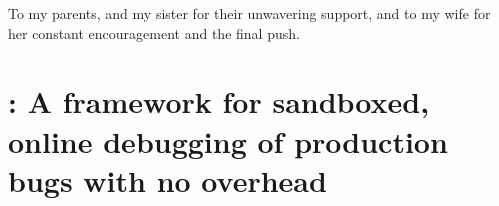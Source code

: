 \documentclass[11pt,openright,oneside,letterpaper,onecolumn]{report}  %
\begin{document}
\pagestyle{empty}

\thesistitlepage

\thesiscopyrightpage

\thesisabstract


\pagestyle{plain}

\setlength{\footskip}{0.5in}

\setcounter{tocdepth}{2}
\renewcommand{\contentsname}{Table of Contents}
\tableofcontents
\cleardoublepage

\listoffigures
\cleardoublepage

\listoftables 
\cleardoublepage


\cleardoublepage

\thispagestyle{plain}
\strut \vfill
{
\centering\LARGE{ 
To my parents, and my sister for their unwavering support, 
and to my wife for her constant encouragement and the final push.
}
}
\vfill \strut
\cleardoublepage


\pagestyle{headings}

%
%
\setlength{\textheight}{8.5in}
\setlength{\footskip}{0in}


 {%
\fancyhf{}
\fancyhead[LE,RO]{\thepage}
\fancyhead[RE,LO]{\itshape \leftmark}
\renewcommand{\headrulewidth}{0pt}
}
\pagestyle{plain}





\part{\parikshan: A framework for sandboxed, online debugging of production bugs with no overhead}

\end{document}
